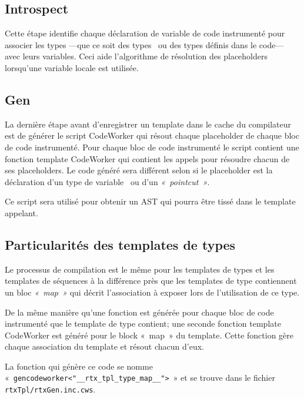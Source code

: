 \documentclass[french]{rtxreport}
\begin{document}
\subsection{Introspect}

Cette étape identifie chaque déclaration de variable de code instrumenté pour
associer les types ---que ce soit des types \rtx\ ou des types
définis dans le code--- avec leurs variables. Ceci aide l'algorithme de
résolution des placeholders lorsqu'une variable locale est utilisée. %

\subsection{Gen}

La dernière étape avant d'enregistrer un template dans le cache du compilateur
est de générer le script CodeWorker qui résout chaque placeholder de chaque bloc
de code instrumenté. Pour chaque bloc de code instrumenté le script contient une
fonction template CodeWorker qui contient les appels pour résoudre chacun de ses
placeholders. Le code généré sera différent selon si le placeholder est la
déclaration d'un type de variable \rtx\ ou d'un \emph{«~pointcut~»}.

Ce script sera utilisé pour obtenir un AST qui pourra être tissé dans le
template appelant.

\subsection{Particularités des templates de types}


Le processus de compilation est le même pour les templates de types et les
templates de séquences à la différence près que les templates de type
contiennent un bloc \emph{«~map~»} qui décrit l'association à exposer lors de
l'utilisation de ce type.

De la même manière qu'une fonction est générée pour chaque bloc de code
instrumenté que le template de type contient; une seconde fonction template
CodeWorker est généré pour le block «~map~» du template. Cette fonction gère
chaque association du template et résout chacun d'eux.

La fonction qui génère ce code se nomme «~\texttt{gencodeworker<"\_\_rtx\_tpl\_type\_map\_\_">}~»
et se trouve dans le fichier \texttt{rtxTpl/rtxGen.inc.cws}.


\end{document}

